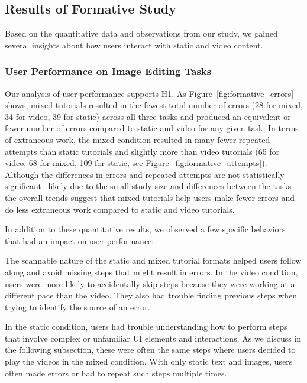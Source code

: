 \subsection{Results of Formative Study}

Based on the quantitative data and observations from our study, we gained several insights about how users interact with static and video content.

\subsubsection{User Performance on Image Editing Tasks}
Our analysis of user performance supports H1. As Figure~\ref{fig:formative_errors} shows, mixed tutorials resulted in the fewest total number of errors (28 for mixed, 34 for video, 39 for static) across all three tasks and produced an equivalent or fewer number of errors compared to static and video for any given task. In terms of extraneous work, the mixed condition resulted in many fewer repeated attempts than static tutorials and slightly more than video tutorials (65 for video, 68 for mixed, 109 for static, see Figure~\ref{fig:formative_attempts}). Although the differences in errors and repeated attempts are not statistically significant–-likely due to the small study size and differences between the tasks-–the overall trends suggest that mixed tutorials help users make fewer errors and do less extraneous work compared to static and video tutorials.

In addition to these quantitative results, we observed a few specific behaviors that had an impact on user performance:

The scannable nature of the static and mixed tutorial formats helped users follow along and avoid missing steps that might result in errors. In the video condition, users were more likely to accidentally skip steps because they were working at a different pace than the video. They also had trouble finding previous steps when trying to identify the source of an error.

In the static condition, users had trouble understanding how to perform steps that involve complex or unfamiliar UI elements and interactions. As we discuss in the following subsection, these were often the same steps where users decided to play the videos in the mixed condition. With only static text and images, users often made errors or had to repeat such steps multiple times.

